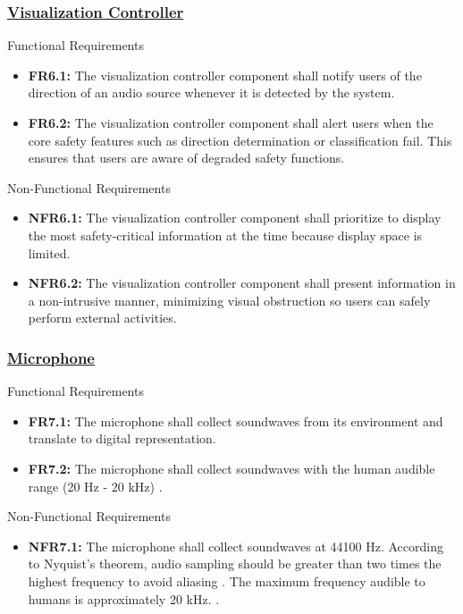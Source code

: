 \documentclass[12pt]{article}
\theoremstyle{definition}
\begin{document}
\subsubsection{\hyperref[comp:viz_controller]{Visualization Controller}}
Functional Requirements\label{sec:FR6}
\begin{itemize}
  \item \label{FR6_1}\textbf{FR6.1:} The visualization controller component
  shall notify users of the direction of an audio source whenever it is detected
  by the system.

  \item \label{FR6_2}\textbf{FR6.2:} The visualization controller component
  shall alert users when the core safety features such as direction
  determination or classification fail. This ensures that users are aware of
  degraded safety functions.
\end{itemize}

Non-Functional Requirements
\begin{itemize}
  \item \label{NFR6_1}\textbf{NFR6.1:} The visualization controller component
  shall prioritize to display the most safety-critical information at the time
  because display space is limited.
  \item \label{NFR6_2}\textbf{NFR6.2:} The visualization controller component
  shall present information in a non-intrusive manner, minimizing visual
  obstruction so users can safely perform external activities.
\end{itemize}

\subsubsection{\hyperref[comp:microphone]{Microphone}} Functional Requirements
\begin{itemize}
  \item \label{FR7_1}\textbf{FR7.1:} The microphone shall collect soundwaves
  from its environment and translate to digital representation.

  \item \label{FR7_2}\textbf{FR7.2:} The microphone shall collect soundwaves
  with the human audible range (20 Hz - 20 kHz) \cite{Neuroscience2001}.
\end{itemize}

Non-Functional Requirements
\begin{itemize}
  \item \label{NFR7_1}\textbf{NFR7.1:} The microphone shall collect soundwaves
  at 44100 Hz. According to Nyquist's theorem, audio sampling should be greater
  than two times the highest frequency to avoid aliasing \cite{DataForth2025}.
  The maximum frequency audible to humans is approximately 20 kHz.
  \cite{Neuroscience2001}.
\end{itemize}
\end{document}

